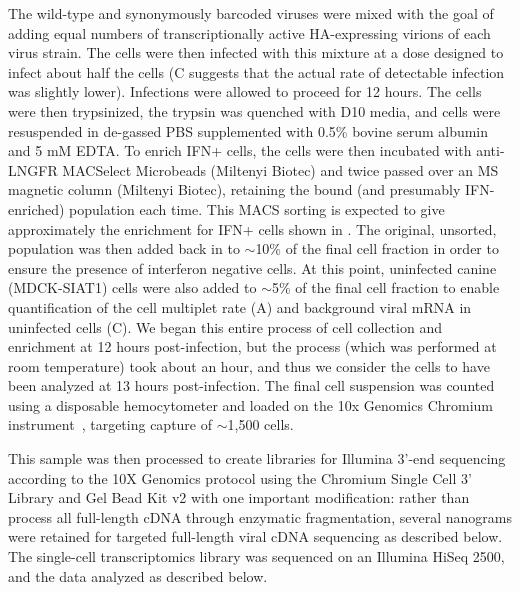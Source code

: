 \documentclass[9pt,lineno]{elife}
\begin{document}
The wild-type and synonymously barcoded viruses were mixed with the goal of adding equal numbers of transcriptionally active HA-expressing virions of each virus strain.
The cells were then infected with this mixture at a dose designed to infect about half the cells (C suggests that the actual rate of detectable infection was slightly lower).
Infections were allowed to proceed for 12 hours.
The cells were then trypsinized, the trypsin was quenched with D10 media, and cells were resuspended in de-gassed PBS supplemented with 0.5\% bovine serum albumin and 5 mM EDTA. 
To enrich IFN+ cells, the cells were then incubated with anti-LNGFR MACSelect Microbeads (Miltenyi Biotec) and twice passed over an MS magnetic column (Miltenyi Biotec), retaining the bound (and presumably IFN-enriched) population each time. 
This MACS sorting is expected to give approximately the enrichment for IFN+ cells shown in .
The original, unsorted, population was then added back in to $\sim$10\% of the final cell fraction in order to ensure the presence of interferon negative cells. 
At this point, uninfected canine (MDCK-SIAT1) cells were also added to $\sim$5\% of the final cell fraction to enable quantification of the cell multiplet rate (A) and background viral mRNA in uninfected cells (C). 
We began this entire process of cell collection and enrichment at 12 hours post-infection, but the process (which was performed at room temperature) took about an hour, and thus we consider the cells to have been analyzed at 13 hours post-infection.
The final cell suspension was counted using a disposable hemocytometer and loaded on the 10x Genomics Chromium instrument~\citep{zheng2017massively}, targeting capture of $\sim$1,500 cells. 

This sample was then processed to create libraries for Illumina 3'-end sequencing according to the 10X Genomics protocol using the Chromium Single Cell 3' Library and Gel Bead Kit v2 with one important modification: rather than process all full-length cDNA through enzymatic fragmentation, several nanograms were retained for targeted full-length viral cDNA sequencing as described below.
The single-cell transcriptomics library was sequenced on an Illumina HiSeq 2500, and the data analyzed as described below.
\end{document}
